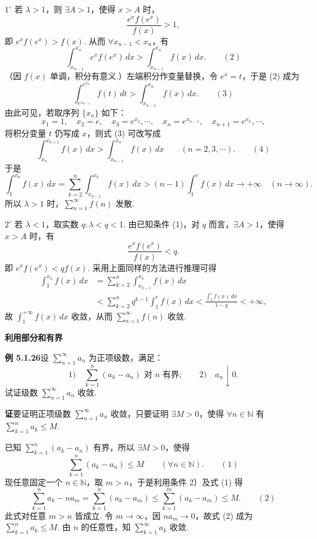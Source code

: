 \documentclass[UTF8, 12pt, fontset=fandol, oneside]{ctexart}
\begin{document}
$1^\circ$ 若 $\lambda>1$，则 $\exists A>1$，使得 $x>A$ 时，
\[
  \frac{e^xf(e^x)}{f(x)}>1,
\]
即 $e^xf(e^x)>f(x)$. 从而 $\forall x_{n-1}<x_n$，有
\[
  \int_{x_{n-1}}^{x_n} e^xf(e^x)\,dx>\int_{x_{n-1}}^{x_n}f(x)\,dx.
\qquad(2)
\]
（因 $f(x)$ 单调，积分有意义.）左端积分作变量替换，令 $e^x=t$，于是 (2) 成为
\[
  \int_{e^{x_{n-1}}}^{e^{x_n}}f(t)\,dt>\int_{x_{n-1}}^{x_n}f(x)\,dx.
\qquad(3)
\]
由此可见，若取序列 $\{x_n\}$ 如下：
\[
  x_1=1,\quad x_2=e,\quad x_3=e^{x_2},\cdots,\quad
  x_n=e^{x_{n-1}},\quad x_{n+1}=e^{x_n},\cdots,
\]
将积分变量 $t$ 仍写成 $x$，则式 (3) 可改写成
\[
  \int_{x_n}^{x_{n+1}}f(x)\,dx>\int_{x_{n-1}}^{x_n}f(x)\,dx
  \qquad(n=2,3,\cdots).
\qquad(4)
\]
于是
\[
  \int_1^{x_n}f(x)\,dx
  =\sum_{k=2}^n\int_{x_{k-1}}^{x_k}f(x)\,dx
  >(n-1)\int_1^e f(x)\,dx\to+\infty\quad(n\to\infty).
\]
所以 $\lambda>1$ 时，$\displaystyle\sum_{n=1}^\infty f(n)$ 发散.

$2^\circ$ 若 $\lambda<1$，取实数 $q:\lambda<q<1$. 由已知条件 (1)，对 $q$ 而言，$\exists A>1$，使得 $x>A$ 时，有
\[
  \frac{e^xf(e^x)}{f(x)}<q.
\]
即 $e^xf(e^x)<qf(x)$. 采用上面同样的方法进行推理可得
\[
\begin{aligned}
\int_1^{x_n}f(x)\,dx
&=\sum_{k=2}^n\int_{x_{k-1}}^{x_k}f(x)\,dx\\
&<\sum_{k=2}^n q^{k-1}\int_1^e f(x)\,dx
<\frac{\int_1^e f(x)\,dx}{1-q}<+\infty,
\end{aligned}
\]
故 $\displaystyle\int_1^{+\infty}f(x)\,dx$ 收敛，从而 $\displaystyle\sum_{n=1}^\infty f(n)$ 收敛.

\noindent\textbf{利用部分和有界}

\noindent\textbf{例 5.1.26}\quad 设 $\displaystyle\sum_{n=1}^\infty a_n$ 为正项级数，满足：
\[
  1)\quad \sum_{k=1}^n(a_k-a_n)\text{ 对 }n\text{ 有界};\qquad
  2)\quad a_n\downarrow0.
\]
试证级数 $\displaystyle\sum_{n=1}^\infty a_n$ 收敛.

\noindent\textbf{证}\quad 要证明正项级数 $\displaystyle\sum_{n=1}^\infty a_n$ 收敛，只要证明 $\exists M>0$，使得 $\forall n\in\mathbb{N}$ 有 $\displaystyle\sum_{k=1}^n a_k\le M$.

已知 $\displaystyle\sum_{k=1}^n(a_k-a_n)$ 有界，所以 $\exists M>0$，使得
\[
  \sum_{k=1}^n(a_k-a_n)\le M\qquad(\forall n\in\mathbb{N}).
\qquad(1)
\]
现任意固定一个 $n\in\mathbb{N}$，取 $m>n$，于是利用条件 2）及式 (1) 得
\[
  \sum_{k=1}^n a_k-na_m
  =\sum_{k=1}^n(a_k-a_m)
  \le\sum_{k=1}^m(a_k-a_m)\le M.
\qquad(2)
\]
此式对任意 $m>n$ 皆成立. 令 $m\to\infty$，因 $na_m\to0$，故式 (2) 成为 $\displaystyle\sum_{k=1}^n a_k\le M$. 由 $n$ 的任意性，知 $\displaystyle\sum_{k=1}^\infty a_k$ 收敛.
\end{document}

